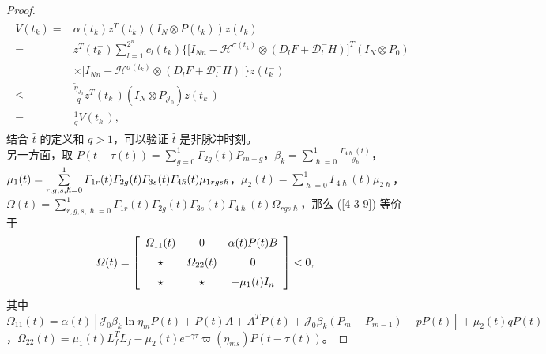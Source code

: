\begin{proof}
\begin{align}
    \begin{split}
    V(t_k)
    =&\alpha(t_k)z^T(t_k)(I_N\otimes P(t_k))z(t_k)\\
    =&z^T(t^-_k)\sum\limits_{l=1}^{2^n}c_{l}(t_k)\Big\{\big[I_{Nn}- \mathcal{H}^{\sigma(t_k)} \otimes (D_{l}F+\mathscr{D}_{l}^-H)\big]^T ( I_N\otimes P_0)\\
    &\times\big[I_{Nn}- \mathcal{H}^{\sigma(t_k)} \otimes (D_{l}F+\mathscr{D}_{l}^-H)\big]\Big\}z(t^-_k)\\
    \leq&\frac{\tilde{\eta}_{J_0}}{q}z^T(t^-_k) (I_N\otimes P_{\mathcal{J}_0})z(t^-_k)\\
    =&\frac{1}{q} V(t^-_k),
    \end{split}
    \end{align}
    结合 $\hat{t}$ 的定义和 $q>1$，可以验证  $\hat{t}$ 是非脉冲时刻。\\
   另一方面，取 
    $P(t-\tau(t))=\sum\limits_{g=0}^{1}\varGamma_{2 g}(t) P_{m-g}$，$\beta_k = \sum\limits_{\hslash=0}^{1}\frac{\varGamma_{4 \hslash}(t) }{ \vartheta_\hslash}$，$\mu_1(t)= \sum\limits_{r,g,s,\hslash=0}^{1}\varGamma_{1 r}(t)\varGamma_{2g}(t)\\\varGamma_{3s}(t)\varGamma_{4\hslash}(t)\mu_{1rgs\hslash}$，$  \mu_2(t)=\sum\limits_{\hslash=0}^{1} \varGamma_{4\hslash}(t) \mu_{2\hslash}$，$\varOmega (t)=\sum\limits_{r,g,s,\hslash=0}^{1}\varGamma_{1 r}(t)\varGamma_{2g}(t)\varGamma_{3s}(t)\varGamma_{4\hslash}(t) \varOmega_{rgs\hslash}$，那么 (\ref{4-3-9}) 等价于
    \begin{align}\label{4-3-14} 
    \varOmega (t)= \left[ \begin{array}{ccc}
    \varOmega_{11}(t) &0&  \alpha(t)P(t)B \vspace{0.2cm}\\
    \star&\varOmega_{22}(t) &0 \vspace{0.2cm}\\
    \star&\star& -\mu_1(t)I_n\\
    \end{array}
    \right]< 0,
    \end{align}
    其中
    $
    \varOmega_{11}(t)= \alpha(t)[\mathcal{J}_0\beta_{k}\ln \eta_mP(t)+P(t)A+A^TP(t) +\mathcal{J}_0\beta_{k}(P_m-P_{m-1})-p P(t)]
    +\mu_2(t)qP(t)$，$
    \varOmega_{22}(t)= \mu_1(t)L^T_f L_f-\mu_2(t)
    e^{-\gamma\tau}\varpi(\eta_{ms}) P(t-\tau(t))  
    $。
    

\end{proof}
